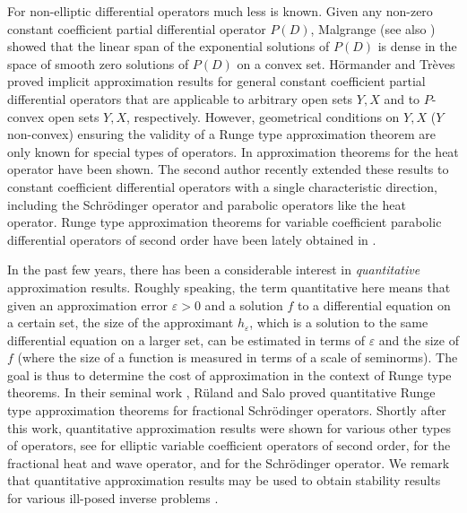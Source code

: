 \documentclass[12pt]{amsart}
\theoremstyle{definition}
\theoremstyle{remark}
\numberwithin{equation}{section}
\begin{document}
For non-elliptic differential operators much less is known.  Given any non-zero constant coefficient partial differential operator $P(D)$, Malgrange \cite[Chapitre 1.2, Th\'eor\`eme 2]{Malgrange} (see also  \cite[Theorem 10.5.1]{HoermanderPDO2}) showed that the linear span of the exponential solutions of $P(D)$ is dense in the space of smooth zero solutions of $P(D)$ on a  convex set. H\"ormander \cite[Theorem 10.5.2]{HoermanderPDO2} and Tr\`eves \cite[Theorem 26.1]{Treves1967-2} proved implicit approximation results for general constant coefficient partial differential operators that are applicable to arbitrary open sets $Y, X$ and to $P$-convex open sets $Y,X$, respectively. However, geometrical conditions on  $Y,X$ ($Y$ non-convex) ensuring the validity of a Runge type approximation theorem are only known for special types of operators. In \cite{Diaz1980,GT,Jones1975} approximation theorems for the heat operator have been shown. The second author \cite{Kalmes21} recently extended these results to constant coefficient differential operators  with a single characteristic direction, including the Schr\"odinger operator and parabolic operators like the heat operator. Runge type approximation theorems  for variable coefficient  parabolic differential operators of second order have been lately obtained in \cite{EnGaPe19}. 

In the past few years, there has been a considerable interest in \emph{quantitative} approximation results. Roughly speaking, the term quantitative  here means that given an approximation error  $\varepsilon>0$  and a solution $f$ to a differential equation on a certain set, the size of the approximant $h_\varepsilon$, which is a solution to the same differential equation on a larger set, can be estimated in terms of $\varepsilon$ and the size of $f$ (where the size of a function is measured in terms of a scale of seminorms). The goal is thus to determine the cost of approximation in the context of Runge type theorems.  In their seminal work \cite{RuSa20}, R\"uland and Salo proved quantitative  Runge type approximation theorems for  fractional Schr\"odinger operators. Shortly after this work, quantitative  approximation results were shown for various other types of operators, see \cite{RuSa19} for  elliptic variable coefficient operators of second order, \cite{RuSa20-1} for the fractional heat and wave operator, and \cite{EnPe21} for the Schr\"odinger operator. We remark that quantitative approximation results may be used to obtain stability results for various ill-posed inverse problems \cite{Ruland, RuSa19, RuSa20}. 
\end{document}
